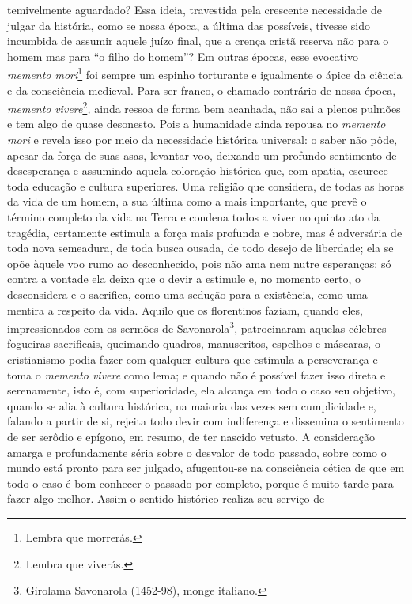 temivelmente aguardado? Essa ideia, travestida pela crescente
necessidade de julgar da história, como se nossa época, a última das
possíveis, tivesse sido incumbida de assumir aquele juízo final, que a
crença cristã reserva não para o homem mas para ``o filho do homem''? Em
outras épocas, esse evocativo \emph{memento mori}\footnote{Lembra que
  morrerás.} foi sempre um espinho torturante e igualmente o ápice da
ciência e da consciência medieval. Para ser franco, o chamado contrário
de nossa época, \emph{memento} \emph{vivere}\footnote{Lembra que
  viverás.}\emph{,} ainda ressoa de forma bem acanhada, não sai a plenos
pulmões e tem algo de quase desonesto. Pois a humanidade ainda repousa
no \emph{memento mori} e revela isso por meio da necessidade histórica
universal: o saber não pôde, apesar da força de suas asas, levantar voo,
deixando um profundo sentimento de desesperança e assumindo aquela
coloração histórica que, com apatia, escurece toda educação e cultura
superiores. Uma religião que considera, de todas as horas da vida de um
homem, a sua última como a mais importante, que prevê o término completo
da vida na Terra e condena todos a viver no quinto ato da tragédia,
certamente estimula a força mais profunda e nobre, mas é adversária de
toda nova semeadura, de toda busca ousada, de todo desejo de liberdade;
ela se opõe àquele voo rumo ao desconhecido, pois não ama nem nutre
esperanças: só contra a vontade ela deixa que o devir a estimule e, no
momento certo, o desconsidera e o sacrifica, como uma sedução para a
existência, como uma mentira a respeito da vida. Aquilo que os
florentinos faziam, quando eles, impressionados com os sermões de
Savonarola\footnote{Girolama Savonarola (1452-98), monge italiano.},
patrocinaram aquelas célebres fogueiras sacrificais, queimando quadros,
manuscritos, espelhos e máscaras, o cristianismo podia fazer com
qualquer cultura que estimula a perseverança e toma o \emph{memento
vivere} como lema; e quando não é possível fazer isso direta e
serenamente, isto é, com superioridade, ela alcança em todo o caso seu
objetivo, quando se alia à cultura histórica, na maioria das vezes sem
cumplicidade e, falando a partir de si, rejeita todo devir com
indiferença e dissemina o sentimento de ser serôdio e epígono, em
resumo, de ter nascido vetusto. A consideração amarga e profundamente
séria sobre o desvalor de todo passado, sobre como o mundo está pronto
para ser julgado, afugentou-se na consciência cética de que em todo o
caso é bom conhecer o passado por completo, porque é muito tarde para
fazer algo melhor. Assim o sentido histórico realiza seu serviço de
